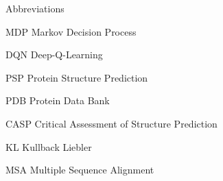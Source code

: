
\begin{dictionary}{Abbreviations}
\item[MDP]  Markov Decision Process
\item[DQN]  Deep-Q-Learning
\item[PSP]  Protein Structure Prediction
\item[PDB]  Protein Data Bank
\item[CASP] Critical Assessment of Structure Prediction
\item[KL]   Kullback Liebler
\item[MSA]  Multiple Sequence Alignment
\end{dictionary}

